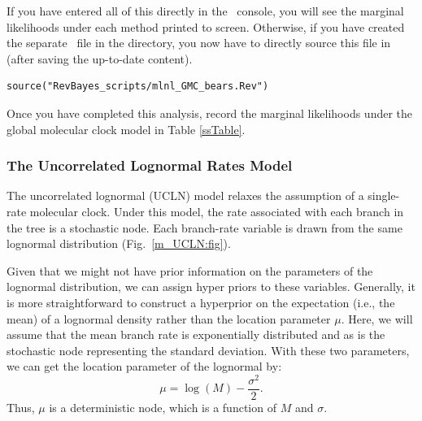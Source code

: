 If you have entered all of this directly in the \RevBayes~console, you will see the marginal likelihoods under each method printed to screen. 
Otherwise, if you have created the separate \Rev~file 
{\textcolor{red}{}} in the  directory, you now have to directly source this file in \RevBayes (after saving the up-to-date content). 

{\tt \begin{snugshade*}
\begin{lstlisting}
source("RevBayes_scripts/mlnl_GMC_bears.Rev")
\end{lstlisting}
\end{snugshade*}}

{\begin{framed}
Once you have completed this analysis, record the marginal likelihoods under the global molecular clock model in Table \ref{ssTable}.
\end{framed}}

\bigskip
\subsubsection{The Uncorrelated Lognormal Rates Model}

The uncorrelated lognormal (UCLN) model relaxes the assumption of a single-rate molecular clock. 
Under this model, the rate associated with each branch in the tree is a stochastic node.
Each branch-rate variable is drawn from the same lognormal distribution (Fig.~\ref{m_UCLN:fig}).

Given that we might not have prior information on the parameters of the lognormal distribution, we can assign hyper priors to these variables. 
Generally, it is more straightforward to construct a hyperprior on the expectation (i.e., the mean) of a lognormal density rather than the location parameter $\mu$. 
Here, we will assume that the mean branch rate is exponentially distributed and as is the stochastic node representing the standard deviation.
With these two parameters, we can get the location parameter of the lognormal by:
$$\mu = \log(M) - \frac{\sigma^2}{2}.$$
Thus, $\mu$ is a deterministic node, which is a function of $M$ and $\sigma$.

